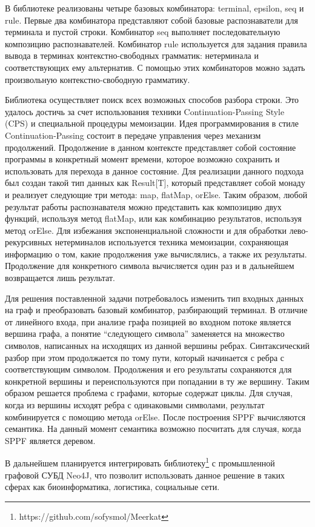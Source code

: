 \documentclass [a4paper] {article}
\begin{document}
В библиотеке реализованы четыре базовых комбинатора: terminal, epsilon, seq и rule. Первые два комбинатора представляют собой базовые распознаватели для терминала и пустой строки. Комбинатор seq выполняет последовательную композицию распознавателей. Комбинатор rule используется для задания правила вывода в терминах контекстно-свободных грамматик: нетерминала и соответствующих ему альтернатив. С помощью этих комбинаторов можно задать произвольную контекстно-свободную грамматику. 


Библиотека осуществляет поиск всех возможных способов разбора строки. Это удалось достичь за счет использования техники Continuation-Passing Style (CPS) и специальной процедуры мемоизации. Идея программирования в стиле Continuation-Passing состоит в передаче управления через механизм продолжений. Продолжение в данном контексте представляет собой состояние программы в конкретный момент времени, которое возможно сохранить и использовать для перехода в данное состояние. Для реализации данного подхода был создан такой тип данных как Result[T],  который представляет собой монаду и реализует следующие три метода: map, flatMap, orElse. Таким образом, любой результат работы распознавателя можно представить как композицию двух функций, используя метод flatMap, или как комбинацию результатов, используя метод orElse. Для избежания экспоненциальной сложности и для обработки лево-рекурсивных нетерминалов используется техника мемоизации, сохраняющая информацию о том, какие продолжения уже вычислялись, а также их результаты. Продолжение для конкретного символа вычисляется один раз и в дальнейшем возвращается лишь результат. 


Для решения поставленной задачи потребовалось изменить тип входных данных на граф и преобразовать базовый комбинатор, разбирающий терминал. В отличие от линейного входа, при анализе графа позицией во входном потоке является вершина графа, а понятие ``следующего символа'' заменяется на множество символов, написанных на исходящих из данной вершины ребрах. Синтаксический разбор при этом продолжается по тому пути, который начинается с ребра с соответствующим символом. Продолжения и его результаты сохраняются для конкретной вершины и переиспользуются при попадании в ту же вершину. Таким образом решается проблема с графами, которые содержат циклы.  Для случая, когда из вершины исходят ребра с одинаковыми символами, результат комбинируется с помощию метода orElse. После построения SPPF вычисляются семантика. На данный момент семантика возможно посчитать для случая, когда SPPF является деревом.


В дальнейшем планируется интегрировать библиотеку\footnote{https://github.com/sofysmol/Meerkat} с промышленной графовой СУБД Neo4J, что позволит использовать данное решение в таких сферах как биоинформатика,  логистика, социальные сети.

\printbibliography

\end{document}

